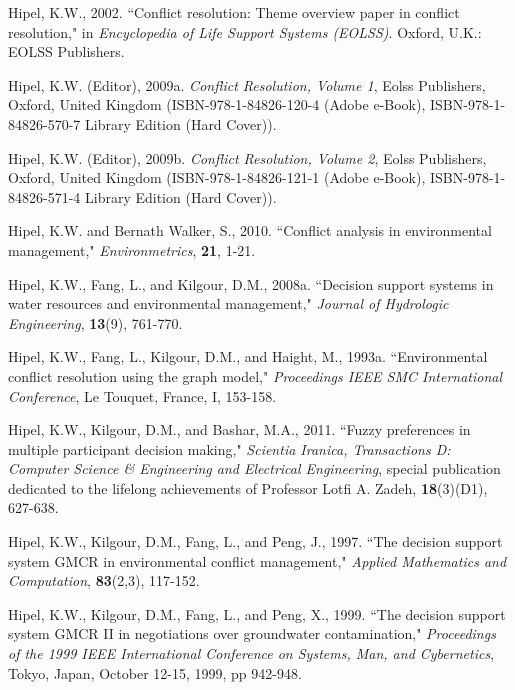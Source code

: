 \documentclass[letterpaper,12pt,titlepage,oneside,final]{book}
\begin{document}
\begin{thebibliography}{}
Hipel, K.W., 2002. ``Conflict resolution: Theme overview paper in conflict resolution," in \emph{Encyclopedia of Life Support Systems (EOLSS)}. Oxford, U.K.: EOLSS Publishers.

Hipel, K.W. (Editor), 2009a. \emph{Conflict Resolution, Volume 1}, Eolss Publishers, Oxford, United Kingdom (ISBN-978-1-84826-120-4 (Adobe e-Book), ISBN-978-1-84826-570-7 Library Edition (Hard Cover)).

Hipel, K.W. (Editor), 2009b. \emph{Conflict Resolution, Volume 2}, Eolss Publishers, Oxford, United Kingdom (ISBN-978-1-84826-121-1 (Adobe e-Book), ISBN-978-1-84826-571-4 Library Edition (Hard Cover)).

Hipel, K.W. and Bernath Walker, S., 2010. ``Conflict analysis in environmental management," \emph{Environmetrics}, {\bf 21}, 1-21.

Hipel, K.W., Fang, L., and Kilgour, D.M., 2008a. ``Decision support systems in water resources and environmental management," \emph{Journal of Hydrologic Engineering}, {\bf 13}(9), 761-770.

Hipel, K.W., Fang, L., Kilgour, D.M., and Haight, M., 1993a. ``Environmental conflict resolution using the graph model," \emph{Proceedings IEEE SMC International Conference}, Le Touquet, France, I, 153-158.

Hipel, K.W., Kilgour, D.M., and Bashar, M.A., 2011. ``Fuzzy preferences in multiple participant decision making," \emph{Scientia Iranica, Transactions D: Computer Science \& Engineering and Electrical Engineering}, special publication dedicated to the lifelong achievements of Professor Lotfi A. Zadeh, {\bf 18}(3)(D1), 627-638.

Hipel, K.W., Kilgour, D.M., Fang, L., and Peng, J., 1997. ``The decision support system GMCR in environmental conflict management," \emph{Applied Mathematics and Computation}, {\bf 83}(2,3), 117-152.

Hipel, K.W., Kilgour, D.M., Fang, L., and Peng, X., 1999. ``The decision support system GMCR II in negotiations over groundwater contamination," \emph{Proceedings of the 1999 IEEE International Conference on Systems, Man, and Cybernetics}, Tokyo, Japan, October 12-15, 1999, pp 942-948.


\end{thebibliography}
\end{document}
